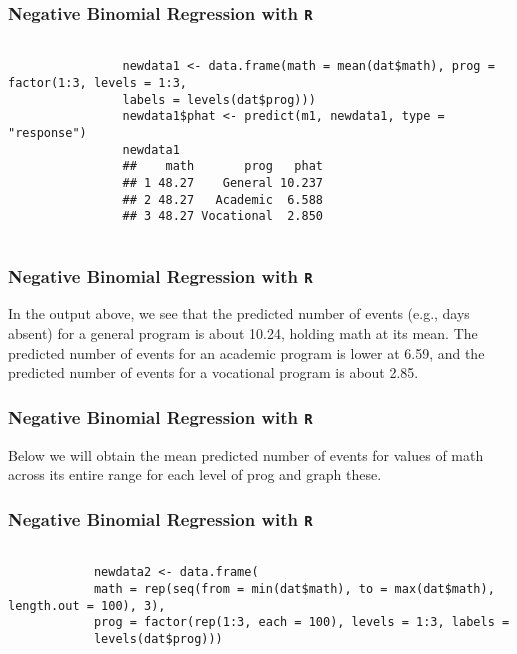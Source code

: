 \documentclass[00-GLMregslides.tex]{subfiles}
\begin{document}
	\begin{frame}[fragile]
		\frametitle{Negative Binomial Regression with \texttt{R} }
		\Large
		
		\begin{framed}
			\begin{verbatim}
			
				newdata1 <- data.frame(math = mean(dat$math), prog = factor(1:3, levels = 1:3, 
				labels = levels(dat$prog)))
				newdata1$phat <- predict(m1, newdata1, type = "response")
				newdata1
				##    math       prog   phat
				## 1 48.27    General 10.237
				## 2 48.27   Academic  6.588
				## 3 48.27 Vocational  2.850
			
			\end{verbatim}	
		\end{framed}
		
		
	\end{frame}
\begin{frame}[fragile]
	\frametitle{Negative Binomial Regression with \texttt{R} }
	\Large
	


	
	In the output above, we see that the predicted number of events (e.g., days absent) for a general program is about 10.24, holding math at its mean. The predicted number of events for an academic program is lower at 6.59, and the predicted number of events for a vocational program is about 2.85.
	\end{frame}
	\begin{frame}[fragile]
		\frametitle{Negative Binomial Regression with \texttt{R} }
		\Large	
	Below we will obtain the mean predicted number of events for values of math across its entire range for each level of prog and graph these.
	\end{frame}
		\begin{frame}[fragile]
		\frametitle{Negative Binomial Regression with \texttt{R} }
		\Large
		
		\begin{framed}
		\begin{verbatim}
		
			newdata2 <- data.frame(
			math = rep(seq(from = min(dat$math), to = max(dat$math), length.out = 100), 3),
			prog = factor(rep(1:3, each = 100), levels = 1:3, labels =
			levels(dat$prog)))
		\end{verbatim}	
		\end{framed}
		
		
		\end{frame}
\end{document}
